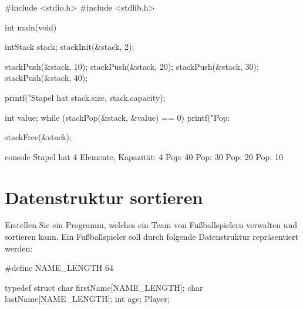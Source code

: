\Vorlage
\begin{codebox}[lang=c, fontsize=\small]
#include <stdio.h>
#include <stdlib.h>

int main(void) {
    intStack stack;
    stackInit(&stack, 2);

    stackPush(&stack, 10);
    stackPush(&stack, 20);
    stackPush(&stack, 30);
    stackPush(&stack, 40);

    printf("Stapel hat %
           stack.size, stack.capacity);

    int value;
    while (stackPop(&stack, &value) == 0) {
        printf("Pop: %
    }

    stackFree(&stack);
}
\end{codebox}

\begin{mybox}[Bildschirmausgabe]{console}
Stapel hat 4 Elemente, Kapazität: 4
Pop: 40
Pop: 30
Pop: 20
Pop: 10
\end{mybox}




\chapter{Datenstruktur sortieren}

\vspace{10pt}

Erstellen Sie ein Programm, welches ein Team von Fußballspielern verwalten und
sortieren kann. Ein Fußballspieler soll durch folgende Datenstruktur
repräsentiert werden:

\begin{codebox}[lang=c, fontsize=\small]
#define NAME_LENGTH 64

typedef struct {
    char firstName[NAME_LENGTH];
    char lastName[NAME_LENGTH];
    int age;
} Player;
\end{codebox}

